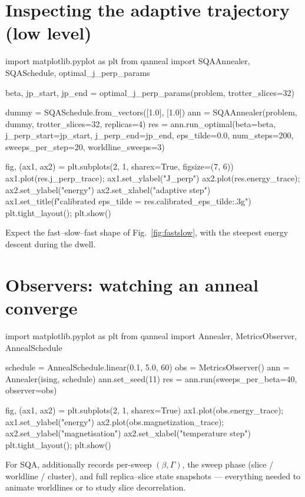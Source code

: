 \section{Inspecting the adaptive trajectory (low level)}

\begin{pycode}
import matplotlib.pyplot as plt
from qanneal import SQAAnnealer, SQASchedule, optimal_j_perp_params

beta, jp_start, jp_end = optimal_j_perp_params(problem, trotter_slices=32)

dummy = SQASchedule.from_vectors([1.0], [1.0])
ann = SQAAnnealer(problem, dummy, trotter_slices=32, replicas=4)
res = ann.run_optimal(beta=beta,
                      j_perp_start=jp_start, j_perp_end=jp_end,
                      eps_tilde=0.0, num_steps=200, sweeps_per_step=20,
                      worldline_sweeps=3)

fig, (ax1, ax2) = plt.subplots(2, 1, sharex=True, figsize=(7, 6))
ax1.plot(res.j_perp_trace);  ax1.set_ylabel("J_perp")
ax2.plot(res.energy_trace);  ax2.set_ylabel("energy")
ax2.set_xlabel("adaptive step")
ax1.set_title(f"calibrated eps_tilde = {res.calibrated_eps_tilde:.3g}")
plt.tight_layout(); plt.show()
\end{pycode}

Expect the fast--slow--fast shape of Fig.~\ref{fig:fastslow}, with the
steepest energy descent during the dwell.

\section{Observers: watching an anneal converge}

\begin{pycode}
import matplotlib.pyplot as plt
from qanneal import Annealer, MetricsObserver, AnnealSchedule

schedule = AnnealSchedule.linear(0.1, 5.0, 60)
obs = MetricsObserver()
ann = Annealer(ising, schedule)
ann.set_seed(11)
res = ann.run(sweeps_per_beta=40, observer=obs)

fig, (ax1, ax2) = plt.subplots(2, 1, sharex=True)
ax1.plot(obs.energy_trace);          ax1.set_ylabel("energy")
ax2.plot(obs.magnetization_trace);   ax2.set_ylabel("magnetisation")
ax2.set_xlabel("temperature step")
plt.tight_layout(); plt.show()
\end{pycode}

For SQA,  additionally records per-sweep
$(\beta,\Gamma)$, the sweep phase (slice / worldline / cluster), and full
replica--slice state snapshots --- everything needed to animate worldlines
or to study slice decorrelation.

